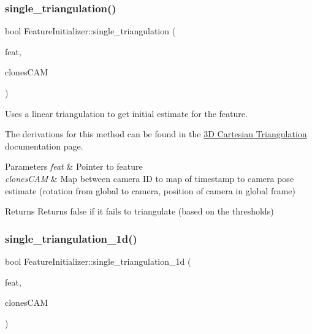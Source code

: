 \subsubsection{\texorpdfstring{single\+\_\+triangulation()}{single\_triangulation()}}
{\footnotesize\ttfamily bool Feature\+Initializer\+::single\+\_\+triangulation (\begin{DoxyParamCaption}\item[{std\+::shared\+\_\+ptr$<$ \hyperlink{classov__core_1_1Feature}{Feature} $>$}]{feat,  }\item[{std\+::unordered\+\_\+map$<$ size\+\_\+t, std\+::unordered\+\_\+map$<$ double, \hyperlink{structov__core_1_1FeatureInitializer_1_1ClonePose}{Clone\+Pose} $>$$>$ \&}]{clones\+C\+AM }\end{DoxyParamCaption})}



Uses a linear triangulation to get initial estimate for the feature. 

The derivations for this method can be found in the \hyperlink{update-featinit_featinit-linear}{3D Cartesian Triangulation} documentation page.


\begin{DoxyParams}{Parameters}
{\em feat} & Pointer to feature \\
\hline
{\em clones\+C\+AM} & Map between camera ID to map of timestamp to camera pose estimate (rotation from global to camera, position of camera in global frame) \\
\hline
\end{DoxyParams}
\begin{DoxyReturn}{Returns}
Returns false if it fails to triangulate (based on the thresholds) 
\end{DoxyReturn}
\mbox{\label{classov__core_1_1FeatureInitializer_a97e8070e331293368ed1fedd62458d5e}} 
\subsubsection{\texorpdfstring{single\+\_\+triangulation\+\_\+1d()}{single\_triangulation\_1d()}}
{\footnotesize\ttfamily bool Feature\+Initializer\+::single\+\_\+triangulation\+\_\+1d (\begin{DoxyParamCaption}\item[{std\+::shared\+\_\+ptr$<$ \hyperlink{classov__core_1_1Feature}{Feature} $>$}]{feat,  }\item[{std\+::unordered\+\_\+map$<$ size\+\_\+t, std\+::unordered\+\_\+map$<$ double, \hyperlink{structov__core_1_1FeatureInitializer_1_1ClonePose}{Clone\+Pose} $>$$>$ \&}]{clones\+C\+AM }\end{DoxyParamCaption})}



